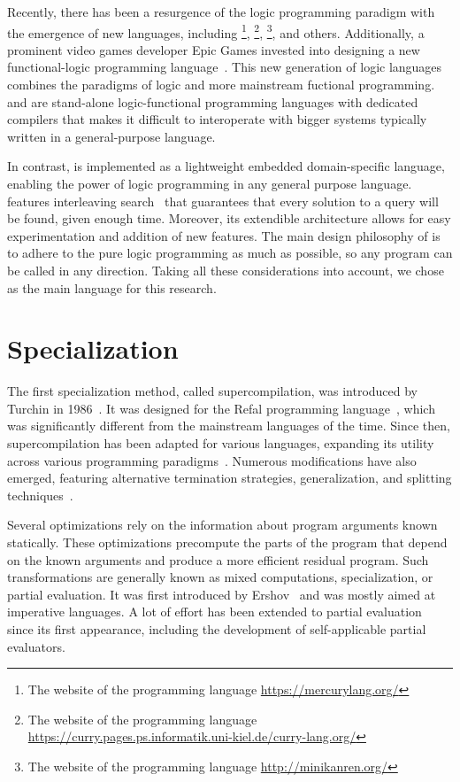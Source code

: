\documentclass[crop=false]{standalone}
\begin{document}
Recently, there has been a resurgence of the logic programming paradigm with the emergence of new languages, including \merc\footnote{The website of the \merc programming language \url{https://mercurylang.org/}}, \curry\footnote{The website of the \curry programming language \url{https://curry.pages.ps.informatik.uni-kiel.de/curry-lang.org/}}, \mk\footnote{The website of the \mk programming language \url{http://minikanren.org/}}, and others.
Additionally, a prominent video games developer Epic Games invested into designing a new functional-logic programming language~\cite{versecalculus}.
This new generation of logic languages combines the paradigms of logic and more mainstream fuctional programming. 
\merc and \curry are stand-alone logic-functional programming languages with dedicated compilers that makes it difficult to interoperate with bigger systems typically written in a general-purpose language. 

In contrast, \mk is implemented as a lightweight embedded domain-specific language, enabling the power of logic programming in any general purpose language. 
\mk features interleaving search~\cite{kiselyov2005backtracking} that guarantees that every solution to a query will be found, given enough time. 
Moreover, its extendible architecture allows for easy experimentation and addition of new features. 
The main design philosophy of \mk is to adhere to the pure logic programming as much as possible, so any program can be called in any direction. 
Taking all these considerations into account, we chose \mk as the main language for this research. 

\section{Specialization}
  
The first specialization method, called supercompilation, was introduced by Turchin in 1986~\cite{turchin1986concept}.
It was designed for the Refal programming language~\cite{turchin1989refal}, which was significantly different from the mainstream languages of the time.
Since then, supercompilation has been adapted for various languages, expanding its utility across various programming paradigms~\cite{klyuchnikov2009supercompiler,mitchell2010rethinking}.
Numerous modifications have also emerged, featuring alternative termination strategies, generalization, and splitting techniques~\cite{leuschel2002homeomorphic,sorensen1995algorithm,turchin1988algorithm}. 

Several optimizations rely on the information about program arguments known statically. 
These optimizations precompute the parts of the program that depend on the known arguments and produce a more efficient residual program. 
Such transformations are generally known as mixed computations, specialization, or partial evaluation. 
It was first introduced by Ershov~\cite{ERSHOV198241} and was mostly aimed at imperative languages. 
A lot of effort has been extended to partial evaluation~\cite{jones1993partial,intro2partialEvaluation} since its first appearance, including the development of self-applicable partial evaluators. 
\end{document}
